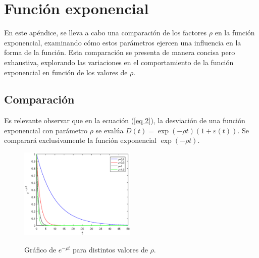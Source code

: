 \chapter{Función exponencial}\label{Apendice_A}
En este apéndice, se lleva a cabo una comparación  de los factores $\rho$ en la función exponencial, examinando cómo estos parámetros ejercen una influencia en la forma de la función. Esta comparación se presenta de manera concisa pero exhaustiva, explorando las variaciones en el comportamiento de la función exponencial en función de los valores de $\rho$.

\section{Comparación}
Es relevante observar que en la ecuación (\ref{eq 2}), la desviación de una función exponencial con parámetro $\rho$ se evalúa 
$D(t) = \exp( - \rho t)(1 + \varepsilon(t)).$ 
Se comparará exclusivamente la función exponencial $\exp(-\rho t)$.

\begin{figure}[!h]
\begin{center}
\vspace{-0.4cm}
\includegraphics[width=0.495\textwidth]{10_ApendiceA/graficos/graf.eps}
\vspace{-0.4cm} 
\caption{Gráfico de $e^{- \rho t}$ para distintos valores de $\rho$.}
\vspace{-0.0cm}
\label{fig_comparación}
\end{center}
\end{figure}
